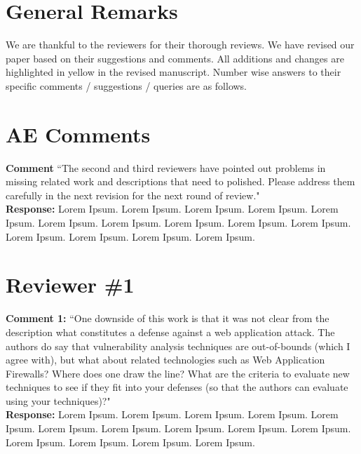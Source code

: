 \documentclass[10pt,journal,compsoc]{IEEEtran}
\begin{document}
\maketitle

\IEEEdisplaynontitleabstractindextext

\IEEEpeerreviewmaketitle

\section{General Remarks}
\label{sec:rem}

We are thankful to the reviewers for their thorough reviews.
We have revised our paper based on their suggestions and comments.
All additions and changes are highlighted in yellow
in the revised manuscript.
Number wise answers to their specific
comments / suggestions / queries are as follows.

\section{AE Comments}
\label{sec:ae}

{\bf Comment} ``The second and third reviewers have pointed out problems in missing related work and
descriptions that need to polished. Please address them carefully in the next revision
for the next round of review."\\

\noindent
{\bf Response:}
Lorem Ipsum. Lorem Ipsum. Lorem Ipsum. Lorem Ipsum. Lorem Ipsum. Lorem Ipsum. Lorem Ipsum. Lorem Ipsum. Lorem Ipsum. Lorem Ipsum. Lorem Ipsum. Lorem Ipsum. Lorem Ipsum. Lorem Ipsum.\\

\section{Reviewer \#1}
\label{sec:r1}

{\bf Comment 1:} ``One downside of this work is that it was not clear from the
description what constitutes a defense against a web application
attack. The authors do say that vulnerability analysis techniques are
out-of-bounds (which I agree with), but what about related
technologies such as Web Application Firewalls? Where does one draw
the line? What are the criteria to evaluate new techniques to see if
they fit into your defenses (so that the authors can evaluate using
your techniques)?"\\

\noindent
{\bf Response:}
Lorem Ipsum. Lorem Ipsum. Lorem Ipsum. Lorem Ipsum. Lorem Ipsum. Lorem Ipsum. Lorem Ipsum. Lorem Ipsum. Lorem Ipsum. Lorem Ipsum. Lorem Ipsum. Lorem Ipsum. Lorem Ipsum. Lorem Ipsum.\\
\end{document}
